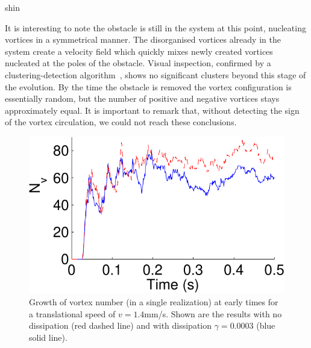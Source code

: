 \begin{chapter}{\label{cha:shin}shin}

It is interesting to note the obstacle is still in the system 
at this point, nucleating vortices in a symmetrical manner. 
The disorganised vortices already in the system create a velocity 
field which quickly mixes newly created vortices nucleated at the
poles of the obstacle. Visual inspection, confirmed by a 
clustering-detection algorithm~\citep{white12,reeves_billam_13}, 
shows no significant clusters beyond this stage of the evolution. 
By the time the obstacle is removed the vortex configuration is 
essentially random, but 
the number of positive and negative vortices stays approximately equal.
It is important to remark that, without detecting the sign of the vortex circulation, we
could not reach these conclusions.

\begin{figure}
\begin{minipage}{0.5\textwidth}
\caption{\label{fig:N_vTime} Growth of vortex number (in a single realization) at early times for a translational speed of $v=1.4$mm/s. Shown are the results with no dissipation (red dashed line) and with dissipation $\gamma=0.0003$ (blue solid line).}
\end{minipage} \hfill
\begin{minipage}{0.5\textwidth}
\centering
\includegraphics[width=0.9\linewidth]{shin/fig3}
\end{minipage} \hfill
\end{figure}

\end{chapter}
